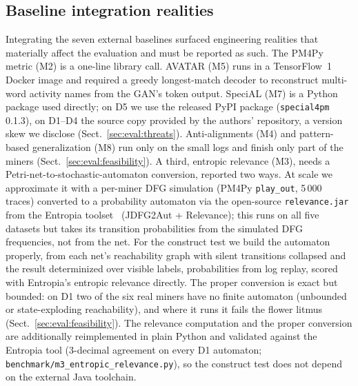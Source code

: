 \documentclass[runningheads]{llncs}
\newcommand{\chg}[1]{\textcolor{chgblue}{#1}}
\begin{document}
\subsection{Baseline integration realities}
\label{sec:impl:baselines}
Integrating the seven external baselines surfaced engineering realities that materially affect the evaluation and must be reported as such. The PM4Py metric (M2) is a one-line library call. AVATAR (M5) runs in a TensorFlow~1 Docker image and required a greedy longest-match decoder to reconstruct multi-word activity names from the GAN's token output. SpeciAL (M7) is a Python package used directly\chg{; on D5 we use the released PyPI package (\texttt{special4pm} 0.1.3), on D1--D4 the source copy provided by the authors' repository, a version skew we disclose (Sect.~\ref{sec:eval:threats})}. \chg{Anti-alignments (M4) and pattern-based generalization (M8) run only on the small logs and finish only part of the miners} (Sect.~\ref{sec:eval:feasibility}). A third, entropic relevance (M3), needs a Petri-net-to-stochastic-automaton conversion, reported two ways. \chg{At scale we approximate it with a per-miner DFG simulation (PM4Py \texttt{play\_out}, 5\,000 traces) converted to a probability automaton via the open-source \texttt{relevance.jar} from the Entropia toolset~\cite{polyvyanyy2020entropia} (JDFG2Aut + Relevance); this runs on all five datasets but takes its transition probabilities from the simulated DFG frequencies, not from the net. For the construct test we build the automaton properly, from each net's reachability graph with silent transitions collapsed and the result determinized over visible labels, probabilities from log replay, scored with Entropia's entropic relevance directly. The proper conversion is exact but bounded: on D1 two of the six real miners have no finite automaton (unbounded or state-exploding reachability), and where it runs it fails the flower litmus (Sect.~\ref{sec:eval:feasibility}). The relevance computation and the proper conversion are additionally reimplemented in plain Python and validated against the Entropia tool ($3$-decimal agreement on every D1 automaton; \texttt{benchmark/m3\_entropic\_relevance.py}), so the construct test does not depend on the external Java toolchain.}
\end{document}
